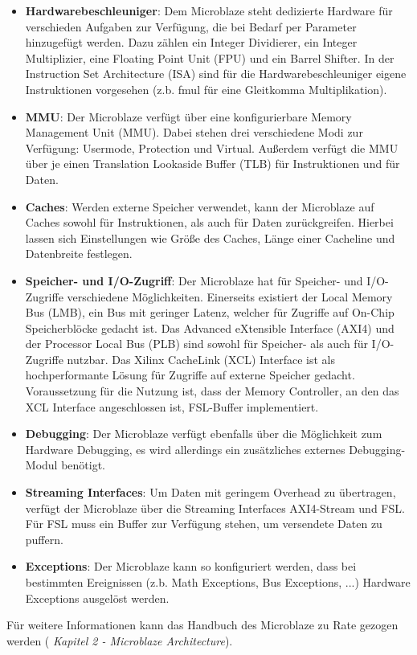 \begin{itemize}
\item \textbf{Hardwarebeschleuniger}: Dem Microblaze steht dedizierte Hardware für verschieden Aufgaben zur Verfügung, die bei Bedarf per Parameter hinzugefügt werden. Dazu zählen ein Integer Dividierer, ein Integer Multiplizier, eine Floating Point Unit (FPU) und ein Barrel Shifter. In der Instruction Set Architecture (ISA) sind für die Hardwarebeschleuniger eigene Instruktionen vorgesehen (z.b. fmul für eine Gleitkomma Multiplikation).
\item \textbf{MMU}: Der Microblaze verfügt über eine konfigurierbare Memory Management Unit (MMU). Dabei stehen drei verschiedene Modi zur Verfügung: Usermode, Protection und Virtual. Außerdem verfügt die MMU über je einen Translation Lookaside Buffer (TLB) für Instruktionen und für Daten.
\item \textbf{Caches}: Werden externe Speicher verwendet, kann der Microblaze auf Caches sowohl für Instruktionen, als auch für Daten zurückgreifen. Hierbei lassen sich Einstellungen wie Größe des Caches, Länge einer Cacheline und Datenbreite festlegen.
\item \textbf{Speicher- und I/O-Zugriff}: Der Microblaze hat für Speicher- und I/O-Zugriffe verschiedene Möglichkeiten. Einerseits existiert der Local Memory Bus (LMB), ein Bus mit geringer Latenz, welcher für Zugriffe auf On-Chip Speicherblöcke gedacht ist. Das Advanced eXtensible Interface (AXI4) und der Processor Local Bus (PLB) sind sowohl für Speicher- als auch für I/O-Zugriffe nutzbar.
Das Xilinx CacheLink (XCL) Interface ist als hochperformante Lösung für Zugriffe auf externe Speicher gedacht. Voraussetzung für die Nutzung ist, dass der Memory Controller, an den das XCL Interface angeschlossen ist, FSL-Buffer implementiert.
\item \textbf{Debugging}: Der Microblaze verfügt ebenfalls über die Möglichkeit zum Hardware Debugging, es wird allerdings ein zusätzliches externes Debugging-Modul benötigt.
\item \textbf{Streaming Interfaces}: Um Daten mit geringem Overhead zu übertragen, verfügt der Microblaze über die Streaming Interfaces AXI4-Stream und FSL. Für FSL muss ein Buffer zur Verfügung stehen, um versendete Daten zu puffern.
\item \textbf{Exceptions}: Der Microblaze kann so konfiguriert werden, dass bei bestimmten Ereignissen (z.b. Math Exceptions, Bus Exceptions, ...) Hardware Exceptions ausgelöst werden.
\end{itemize}
Für weitere Informationen kann das Handbuch des Microblaze zu Rate gezogen werden (\cite{MBREF} \textit{Kapitel 2 - Microblaze Architecture}).
